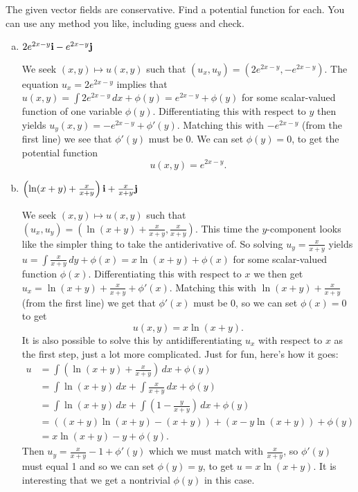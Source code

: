 \begin{problem}
  The given vector fields are conservative. Find a potential function for each. You can use any method you like, including guess and check.
  \begin{enumerate}[(a)]
    \item $2e^{2x-y}\mathbf i-e^{2x-y}\mathbf j$
    \begin{solution}
      We seek $(x,y)\mapsto u(x,y)$ such that $(u_x,u_y)=(2e^{2x-y},-e^{2x-y})$. The equation $u_x=2e^{2x-y}$ implies that $u(x,y)=\int 2e^{2x-y}\,dx+\phi(y)=e^{2x-y}+\phi(y)$ for some scalar-valued function of one variable $\phi(y)$. Differentiating this with respect to $y$ then yields $u_y(x,y)=-e^{2x-y}+\phi'(y)$. Matching this with $-e^{2x-y}$ (from the first line) we see that $\phi'(y)$ must be 0. We can set $\phi(y)=0$, to get the potential function
      \[u(x,y)=e^{2x-y}.\]
    \end{solution}
    \item $\left(\ln(x+y)+\frac{x}{x+y}\right)\mathbf i+\frac{x}{x+y}\mathbf j$
    \begin{solution}
      We seek $(x,y)\mapsto u(x,y)$ such that $(u_x,u_y)=\left(\ln(x+y)+\frac{x}{x+y},\frac{x}{x+y}\right)$. This time the $y$-component looks like the simpler thing to take the antiderivative of. So solving $u_y=\frac{x}{x+y}$ yields $u=\int \frac{x}{x+y}\,dy+\phi(x)=x\ln(x+y)+\phi(x)$ for some scalar-valued function $\phi(x)$. Differentiating this with respect to $x$ we then get $u_x=\ln(x+y)+\frac{x}{x+y}+\phi'(x)$. Matching this with $\ln(x+y)+\frac{x}{x+y}$ (from the first line) we get that $\phi'(x)$ must be 0, so we can set $\phi(x)=0$ to get
      \[u(x,y)=x\ln(x+y).\]
      It is also possible to solve this by antidifferentiating $u_x$ with respect to $x$ as the first step, just a lot more complicated. Just for fun, here's how it goes:
      \[\begin{split}
        u &= \int\left(\ln(x+y)+\frac{x}{x+y}\right)\,dx+\phi(y)\\
        &= \int\ln(x+y)\,dx+\int\frac{x}{x+y}\,dx+\phi(y)\\
        &= \int\ln(x+y)\,dx+\int\left(1-\frac{y}{x+y}\right)\,dx+\phi(y)\\
        &= \left((x+y)\ln(x+y)-(x+y)\right)+\left(x-y\ln(x+y)\right)+\phi(y)\\
        &= x\ln(x+y)-y+\phi(y).
      \end{split}\]
      Then $u_y=\frac{x}{x+y}-1+\phi'(y)$ which we must match with $\frac{x}{x+y}$, so $\phi'(y)$ must equal 1 and so we can set $\phi(y)=y$, to get $u=x\ln(x+y)$. It is interesting that we get a nontrivial $\phi(y)$ in this case.
    \end{solution}
  \end{enumerate}
\end{problem}


